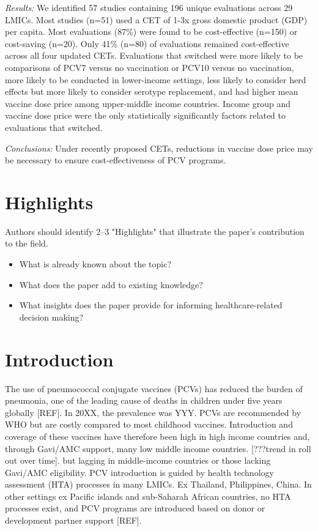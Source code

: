 \documentclass[12pt]{article}
\begin{document}
\textit{Results:} We identified 57 studies containing 196 unique evaluations across 29 LMICs. Most studies (n=51) used a CET of 1-3x gross domestic product (GDP) per capita. Most evaluations (87\%) were found to be cost-effective (n=150) or cost-saving (n=20). Only 41\% (n=80) of evaluations remained cost-effective across all four updated CETs. Evaluations that switched were more likely to be comparisons of PCV7 versus no vaccination or PCV10 versus no vaccination, more likely to be conducted in lower-income settings, less likely to consider herd effects but more likely to consider serotype replacement, and had higher mean vaccine dose price among upper-middle income countries. Income group and vaccine dose price were the only statistically significantly factors related to evaluations that switched. 

\textit{Conclusions:} Under recently proposed CETs, reductions in vaccine dose price may be necessary to ensure cost-effectiveness of PCV programs.


\clearpage
\section{Highlights}
Authors should identify 2–3 "Highlights" that illustrate the paper's contribution to the field. 
\begin{itemize}
    \item What is already known about the topic?
    \item What does the paper add to existing knowledge?
    \item What insights does the paper provide for informing healthcare-related decision making?
\end{itemize}


\clearpage
\section{Introduction}
The use of  pneumococcal conjugate vaccines (PCVs) has  reduced the burden of pneumonia, one of the leading cause of deaths in children under five years globally [REF]. In 20XX, the prevalence was YYY. PCVs are recommended by WHO but are costly compared to most childhood vaccines. Introduction and coverage of these vaccines have therefore been high in high income countries and, through Gavi/AMC support, many low middle income countries. [???trend in roll out over time]. but lagging in middle-income countries or those lacking Gavi/AMC eligibility. PCV introduction is guided by health technology assessment (HTA) processes in many LMICs. Ex Thailand, Philippines, China. In other settings ex Pacific islands and sub-Saharah African countries, no HTA processes exist, and PCV programs are introduced based on donor or development partner support [REF].
\end{document}
